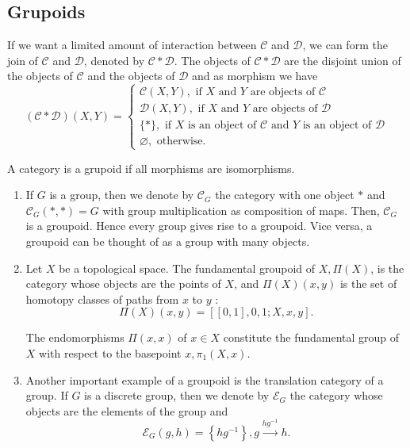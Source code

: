 \begin{example}
\section{Grupoids}

If we want a limited amount of interaction between $\mathcal{C}$ and $\mathcal{D}$, we can form the join of $\mathcal{C}$ and $\mathcal{D}$, denoted by $\mathcal{C} * \mathcal{D}$. The objects of $\mathcal{C} * \mathcal{D}$ are the disjoint union of the objects of $\mathcal{C}$ and the objects of $\mathcal{D}$ and as morphism we have
$$
(\mathcal{C} * \mathcal{D})(X, Y)=\left\{\begin{array}{l}
\mathcal{C}(X, Y), \text { if } X \text { and } Y \text { are objects of } \mathcal{C} \\
\mathcal{D}(X, Y), \text { if } X \text { and } Y \text { are objects of } \mathcal{D} \\
\{*\}, \text { if } X \text { is an object of } \mathcal{C} \text { and } Y \text { is an object of } \mathcal{D} \\
\varnothing, \text { otherwise. }
\end{array}\right.
$$

A category is a grupoid if all morphisms are isomorphisms.

\begin{example}
    \begin{enumerate}
        \item If $G$ is a group, then we denote by $\mathcal{C}_G$ the category with one object $*$ and $\mathcal{C}_G(*, *)=G$ with group multiplication as composition of maps. Then, $\mathcal{C}_G$ is a groupoid. Hence every group gives rise to a groupoid. Vice versa, a groupoid can be thought of as a group with many objects.
        \item Let $X$ be a topological space. The fundamental groupoid of $X, \Pi(X)$, is the category whose objects are the points of $X$, and $\Pi(X)(x, y)$ is the set of homotopy classes of paths from $x$ to $y$ :
        $$
        \Pi(X)(x, y)=[[0,1], 0,1 ; X, x, y] .
        $$
        
        The endomorphisms $\Pi(x, x)$ of $x \in X$ constitute the fundamental group of $X$ with respect to the basepoint $x, \pi_1(X, x)$.
        \item Another important example of a groupoid is the translation category of a group. If $G$ is a discrete group, then we denote by $\mathcal{E}_G$ the category whose objects are the elements of the group and $$\mathcal{E}_G(g, h)=\left\{h g^{-1}\right\}, g \xrightarrow{h g^{-1}} h.$$


\end{enumerate}
\end{example}
\end{example}

